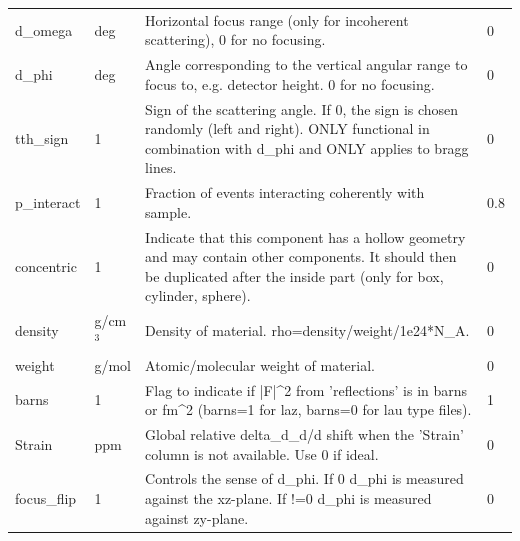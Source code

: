 \begin{longtable}{p{}p{}p{}p{}}
d\_omega & deg & Horizontal focus range (only for incoherent scattering), 0 for no focusing. & 0 \\
d\_phi & deg & Angle corresponding to the vertical angular range to focus to, e.g. detector height. 0 for no focusing. & 0 \\
tth\_sign & 1 & Sign of the scattering angle. If 0, the sign is chosen randomly (left and right). ONLY functional in combination with d\_phi and ONLY applies to bragg lines. & 0 \\
p\_interact & 1 & Fraction of events interacting coherently with sample. & 0.8 \\
concentric & 1 & Indicate that this component has a hollow geometry and may contain other components. It should then be duplicated after the inside part (only for box, cylinder, sphere). & 0 \\
density & g/cm$^{3}$ & Density of material. rho=density/weight/1e24*N\_A. & 0 \\
weight & g/mol & Atomic/molecular weight of material. & 0 \\
barns & 1 & Flag to indicate if |F|\textasciicircum{}2 from 'reflections' is in barns or fm\textasciicircum{}2 (barns=1 for laz, barns=0 for lau type files). & 1 \\
Strain & ppm & Global relative delta\_d\_d/d shift when the 'Strain' column is not available. Use 0 if ideal. & 0 \\
focus\_flip & 1 & Controls the sense of d\_phi. If 0 d\_phi is measured against the xz-plane. If !=0 d\_phi is measured against zy-plane. & 0 \\
\bottomrule
\end{longtable}

